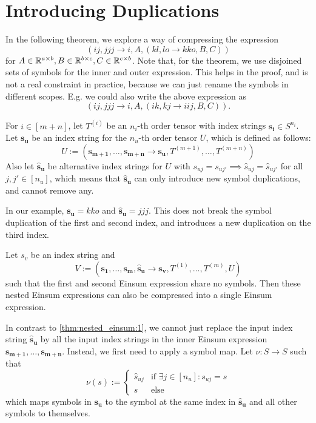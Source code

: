 \section{Introducing Duplications}

In the following theorem, we explore a way of compressing the expression
$$(ij, jjj \rightarrow i, A, (kl, lo \rightarrow kko, B, C))$$
for $A \in \mathbb{R}^{a \times b}, B \in \mathbb{R}^{b \times c}, C \in \mathbb{R}^{c \times b}$.
Note that, for the theorem, we use disjoined sets of symbols for the inner and outer expression.
This helps in the proof, and is not a real constraint in practice,
because we can just rename the symbols in different scopes.
E.g. we could also write the above expression as
$$(ij, jjj \rightarrow i, A, (ik, kj \rightarrow iij, B, C)).$$

\begin{theorem}
    \label{thm:nested_einsum:2}

    For $i \in [m + n]$, let $T^{(i)}$ be an $n_i$-th order tensor with index strings $\bm{s_i} \in S^{n_i}$.
    Let $\bm{s_u}$ be an index string for the $n_u$-th order tensor $U$, which is defined as follows:
    $$U := (\bm{s_{m + 1}},\dots,\bm{s_{m + n}} \rightarrow \bm{s_u}, T^{(m + 1)},\dots,T^{(m + n)})$$
    Also let $\bm{\hat{s}_u}$ be alternative index strings for $U$ with $s_{uj} = s_{uj'} \implies \hat{s}_{uj} = \hat{s}_{uj'}$ for all $j, j' \in [n_u]$,
    which means that $\bm{\hat{s}_u}$ can only introduce new symbol duplications, and cannot remove any.

    In our example, $\bm{s_u} = kko$ and $\bm{\hat{s}_u} = jjj$.
    This does not break the symbol duplication of the first and second index,
    and introduces a new duplication on the third index.

    Let $s_v$ be an index string and
    $$V := (\bm{s_1},\dots,\bm{s_m}, \bm{\hat{s}_u} \rightarrow \bm{s_v}, T^{(1)},\dots,T^{(m)}, U)$$
    such that the first and second Einsum expression share no symbols.
    Then these nested Einsum expressions can also be compressed into a single Einsum expression.

    In contrast to \autoref{thm:nested_einsum:1}, we cannot just replace the input index string $\bm{\hat{s}_u}$ by all the input index strings in the inner Einsum expression $\bm{s_{m + 1}},\dots,\bm{s_{m + n}}$.
    Instead, we first need to apply a symbol map.
    Let $\nu: S \rightarrow S$ such that
    $$\nu(s) := \begin{cases}
            \hat{s}_{uj} & \text{if }\exists j \in [n_u]: s_{uj} = s \\
            s            & \text{else}
        \end{cases}$$
    which maps symbols in $\bm{s_u}$ to the symbol at the same index in $\bm{\hat{s}_u}$ and all other symbols to themselves.


\end{theorem}
